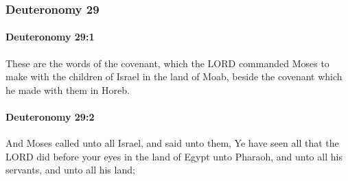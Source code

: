 	\subsubsection{Deuteronomy 29} %
		\label{DEUTERONOMY-29}

		\paragraph{Deuteronomy 29:1} %
			\label{DEUTERONOMY-29-1}

			These are the words of the covenant, which the LORD commanded Moses to make with the children of Israel in the land of Moab, beside the covenant which he made with them in Horeb.


		\paragraph{Deuteronomy 29:2} %
			\label{DEUTERONOMY-29-2}

			And Moses called unto all Israel, and said unto them, Ye have seen all that the LORD did before your eyes in the land of Egypt unto Pharaoh, and unto all his servants, and unto all his land;

